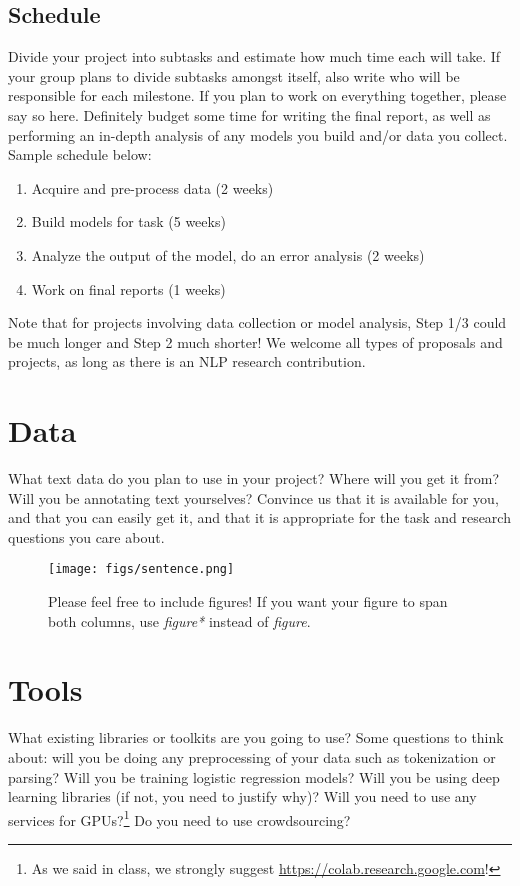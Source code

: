 \documentclass[11pt,a4paper]{article}
\begin{document}
\subsection{Schedule}
Divide your project into subtasks and estimate how much time each will take. If your group plans to divide subtasks amongst itself, also write who will be responsible for each milestone. If you plan to work on everything together, please say so here. Definitely budget some time for writing the final report, as well as performing an in-depth analysis of any models you build and/or data you collect. Sample schedule below:
\begin{enumerate}
    \item Acquire and pre-process data (2 weeks)
    \item Build models for task (5 weeks)
    \item Analyze the output of the model, do an error analysis (2 weeks)
    \item Work on final reports (1 weeks)
\end{enumerate}

Note that for projects involving data collection or model analysis, Step 1/3 could be much longer and Step 2 much shorter! We welcome all types of proposals and projects, as long as there is an NLP research contribution.

\section{Data}

What text data do you plan to use in your project? Where will you get it from? Will you be annotating text yourselves? Convince us that it is available for you, and that you can easily get it, and that it is appropriate for the task and research questions you care about.

\begin{figure}[t]
    \centering
    \texttt{[image: figs/sentence.png]}
    \caption{Please feel free to include figures! If you want your figure to span both columns, use \emph{figure*} instead of \emph{figure}.}
    \label{fig:example}
\end{figure}

\section{Tools}
What existing libraries or toolkits are you going to use? Some questions to think about: will you be doing any preprocessing of your data such as tokenization or parsing? Will you be training logistic regression models? Will you be using deep learning libraries (if not, you need to justify why)? Will you need to use any services for GPUs?\footnote{As we said in class, we strongly suggest \url{https://colab.research.google.com}!} Do you need to use crowdsourcing?


\footnotesize

\end{document}
